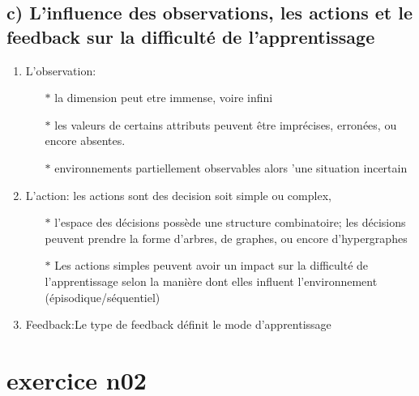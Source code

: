 \documentclass[11pt, a4paper]{article}
\begin{document}
    \subsection*{c) L'influence des observations, les actions et le feedback sur la difficulté de l’apprentissage}
    \begin{enumerate}
    \item  L'observation:
          \begin{itemize}
    
              \item[$\ast$] la dimension peut etre immense, voire infini
              \item[$\ast$]  les valeurs de certains attributs peuvent être imprécises, erronées, ou encore absentes.
              \item[$\ast$]  environnements partiellement observables alors ’une situation incertain
            \end{itemize}
     \item  L'action: les actions sont des decision soit simple ou complex, 
    \begin{itemize}
    
        \item[$\ast$] l’espace des décisions possède une structure combinatoire; les décisions peuvent prendre la forme d’arbres, 
        de graphes, ou encore d’hypergraphes
         \item[$\ast$] Les actions simples peuvent avoir un impact sur la difficulté de 
         l’apprentissage selon la manière dont elles influent l’environnement  (épisodique/séquentiel)
      \end{itemize}
      \item  Feedback:Le type de feedback définit le mode d’apprentissage

     \end{enumerate}
     

\section*{exercice n02}
\end{document}
